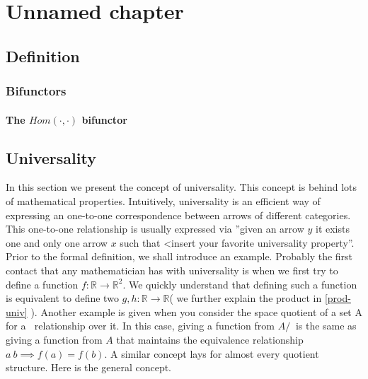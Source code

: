 
\chapter{Unnamed chapter}
\section{Definition}
\subsection{Bifunctors}
\subsubsection{The $Hom(\cdot,\cdot)$ bifunctor}
\section{Universality}
In this section we present the concept of universality. This concept is behind lots of mathematical properties. Intuitively, universality is an efficient way of expressing an one-to-one correspondence between arrows of different categories. This one-to-one relationship is usually expressed via ''given an arrow  $y$ it exists one and only one  arrow $x$ such that <insert your favorite universality property''.\\

Prior to the formal definition, we shall introduce an example. Probably the first contact that any mathematician has with universality is when we first try to define a function  $f:\mathbb R \to \mathbb R^2$. We quickly understand that defining such a function is equivalent to define two $g,h: \mathbb R \to \mathbb R$( we further explain the product in \ref{prod-univ} ). Another example is given when you consider the space quotient of a set A for a $~$ relationship over it. In this case, giving a function from $A/~$ is the same as giving a function from $A$ that maintains the equivalence relationship $a~b \implies f(a)=f(b)$. A similar concept lays for almost every quotient structure. Here is the general concept.

